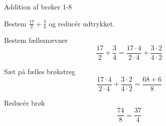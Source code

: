 \documentclass{article}
\begin{document}
\newpage

\begin{exercise}{Addition af brøker 1-8}

Bestem $\frac{17}{2} + \frac{3}{4}$ og reducér udtrykket.


\hint

Bestem fællesnævner
\[
\frac{17}{2} + \frac{3}{4} = \frac{17 \cdot 4}{2 \cdot 4} + \frac{3 \cdot 2}{4\cdot 2}
\]

\hint

Sæt på fælles brøkstreg
\[
\frac{17 \cdot 4}{2 \cdot 4} + \frac{3 \cdot 2}{4\cdot 2} = \frac{68 + 6}{8}
\]

\hint

Reducér brøk
\[
\frac{74}{8} = \frac{37}{4}
\]

\end{exercise}
\end{document}
